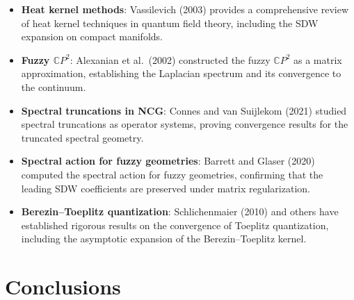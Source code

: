 \documentclass[12pt,a4paper]{article}
\begin{document}
\begin{itemize}
\item \textbf{Heat kernel methods}: Vassilevich (2003) provides a comprehensive
  review of heat kernel techniques in quantum field theory, including the
  SDW expansion on compact manifolds.

\item \textbf{Fuzzy $\mathbb{C}P^2$}: Alexanian et al.\ (2002) constructed
  the fuzzy $\mathbb{C}P^2$ as a matrix approximation, establishing the
  Laplacian spectrum and its convergence to the continuum.

\item \textbf{Spectral truncations in NCG}: Connes and van Suijlekom (2021)
  studied spectral truncations as operator systems, proving convergence
  results for the truncated spectral geometry.

\item \textbf{Spectral action for fuzzy geometries}: Barrett and Glaser (2020)
  computed the spectral action for fuzzy geometries, confirming that the
  leading SDW coefficients are preserved under matrix regularization.

\item \textbf{Berezin--Toeplitz quantization}: Schlichenmaier (2010) and
  others have established rigorous results on the convergence of Toeplitz
  quantization, including the asymptotic expansion of the Berezin--Toeplitz
  kernel.
\end{itemize}

\section{Conclusions}
\label{sec:conclusions}
\end{document}
